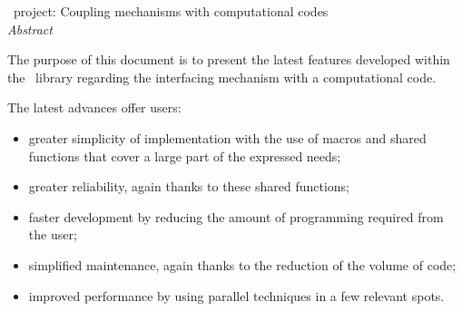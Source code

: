 \vspace{0.5in}
\begin{center}
   \large \centering
  \OT\ project: Coupling mechanisms with computational codes \\
  \vspace{0.3in}
  \emph{ Abstract}
  \vspace{0.5in}
\end{center}

The purpose of this document is to present the latest features developed within the \OT\ library regarding the interfacing mechanism with a computational code.

The latest advances offer users:
\begin{itemize}
\item greater simplicity of implementation with the use of macros and shared functions that cover a large part of the expressed needs;
\item greater reliability, again thanks to these shared functions;
\item faster development by reducing the amount of programming required from the user;
\item simplified maintenance, again thanks to the reduction of the volume of code;
\item improved performance by using parallel techniques in a few relevant spots.
\end{itemize}
